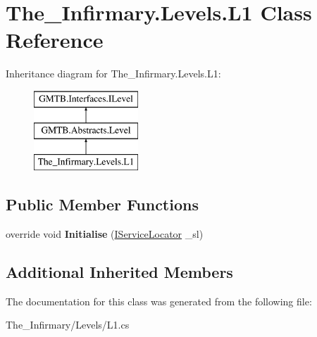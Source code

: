 \hypertarget{class_the___infirmary_1_1_levels_1_1_l1}{}\section{The\+\_\+\+Infirmary.\+Levels.\+L1 Class Reference}
\label{class_the___infirmary_1_1_levels_1_1_l1}
Inheritance diagram for The\+\_\+\+Infirmary.\+Levels.\+L1\+:\begin{figure}[H]
\begin{center}
\leavevmode
\includegraphics[height=3.000000cm]{class_the___infirmary_1_1_levels_1_1_l1}
\end{center}
\end{figure}
\subsection*{Public Member Functions}
\begin{DoxyCompactItemize}
\item 
\mbox{\label{class_the___infirmary_1_1_levels_1_1_l1_a323ed6642d397f9f04608ff0cf42bfd3}} 
override void {\bfseries Initialise} (\mbox{\hyperlink{interface_g_m_t_b_1_1_interfaces_1_1_i_service_locator}{I\+Service\+Locator}} \+\_\+sl)
\end{DoxyCompactItemize}
\subsection*{Additional Inherited Members}


The documentation for this class was generated from the following file\+:\begin{DoxyCompactItemize}
\item 
The\+\_\+\+Infirmary/\+Levels/L1.\+cs\end{DoxyCompactItemize}
